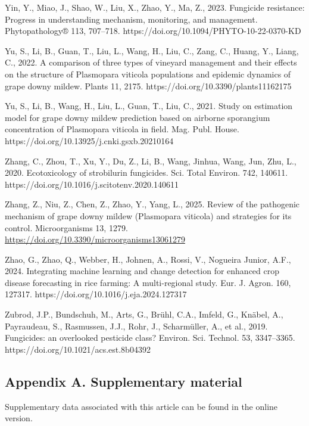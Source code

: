 \documentclass[
]{article}
\begin{document}
Yin, Y., Miao, J., Shao, W., Liu, X., Zhao, Y., Ma, Z., 2023. Fungicide
resistance: Progress in understanding mechanism, monitoring, and
management. Phytopathology® 113, 707--718.
https://doi.org/10.1094/PHYTO-10-22-0370-KD

Yu, S., Li, B., Guan, T., Liu, L., Wang, H., Liu, C., Zang, C., Huang,
Y., Liang, C., 2022. A comparison of three types of vineyard management
and their effects on the structure of Plasmopara viticola populations
and epidemic dynamics of grape downy mildew. Plants 11,
2175. https://doi.org/10.3390/plants11162175

Yu, S., Li, B., Wang, H., Liu, L., Guan, T., Liu, C., 2021. Study on
estimation model for grape downy mildew prediction based on airborne
sporangium concentration of Plasmopara viticola in field. Mag. Publ.
House. https://doi.org/10.13925/j.cnki.gsxb.20210164

Zhang, C., Zhou, T., Xu, Y., Du, Z., Li, B., Wang, Jinhua, Wang, Jun,
Zhu, L., 2020. Ecotoxicology of strobilurin fungicides. Sci. Total
Environ. 742, 140611. https://doi.org/10.1016/j.scitotenv.2020.140611

Zhang, Z., Niu, Z., Chen, Z., Zhao, Y., Yang, L., 2025. Review of the
pathogenic mechanism of grape downy mildew (Plasmopara viticola) and
strategies for its control. Microorganisms 13, 1279.
\url{https://doi.org/10.3390/microorganisms13061279}

Zhao, G., Zhao, Q., Webber, H., Johnen, A., Rossi, V., Nogueira Junior,
A.F., 2024. Integrating machine learning and change detection for
enhanced crop disease forecasting in rice farming: A multi-regional
study. Eur. J. Agron. 160, 127317.
https://doi.org/10.1016/j.eja.2024.127317

Zubrod, J.P., Bundschuh, M., Arts, G., Brühl, C.A., Imfeld, G., Knäbel,
A., Payraudeau, S., Rasmussen, J.J., Rohr, J., Scharmüller, A., et al.,
2019. Fungicides: an overlooked pesticide class? Environ. Sci. Technol.
53, 3347--3365. https://doi.org/10.1021/acs.est.8b04392

\subsection{Appendix A. Supplementary
material}\label{appendix-a.-supplementary-material}

Supplementary data associated with this article can be found in the
online version.
\end{document}
